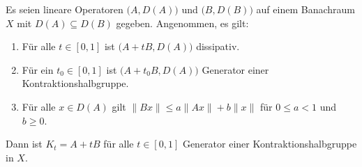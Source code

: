 

\begin{satz}\label{Störungstheorem dissipativer Operatoren 1}
Es seien lineare Operatoren $\big(A, D(A)\big)$ und $\big(B, D(B)\big)$ auf einem Banachraum $X$  mit $D(A)\subseteq D(B)$ gegeben. Angenommen, es gilt:
\begin{enumerate}
\item Für alle $t\in[0,1]$ ist $\big(A+tB, D(A)\big)$ dissipativ.
\item Für ein $t_0\in[0,1]$ ist $\big(A+t_0B, D(A)\big)$ Generator einer Kontraktionshalbgruppe.
\item Für alle $x\in D(A)$ gilt $\|Bx\|\leq a\|Ax\| + b\|x\|$ für $0\leq a< 1$ und $b\geq0$.
\end{enumerate}
Dann ist $K_t=A+tB$ für alle $t\in[0,1]$ Generator einer Kontraktionshalbgruppe in $X$.
\end{satz}

